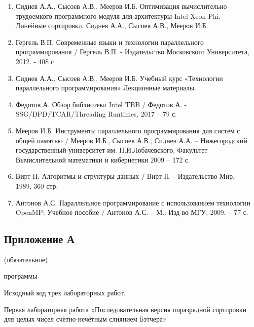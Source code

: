 \documentclass[a4paper,final]{report}
\begin{document}
\begin{spacing}{1.5}
\begin{enumerate}
		    \item Сиднев А.А., Сысоев А.В., Мееров И.Б.  Оптимизация вычислительно трудоемкого программного модуля для архитектуры Intel Xeon Phi. Линейные сортировки. Сиднев А.А., Сысоев А.В., Мееров И.Б. 
		    
			\item Гергель В.П. Современные языки и технологии параллельного программирования / Гергель В.П. - Издательство Московского Университета, 2012. - 408 с.
			
			\item Сиднев А.А., Сысоев А.В., Мееров И.Б. Учебный курс «Технологии параллельного программирования» Лекционные материалы. 
			
			\item Федотов А. Обзор библиотеки Intel TBB / Федотов А. - SSG/DPD/TCAR/Threading Runtimes, 2017 – 79 с.
			
			\item Мееров И.Б. Инструменты параллельного программирования для систем с общей памятью $/$ Мееров И.Б., Сысоев А.В., Сиднев А.А. – Нижегородский государственный университет им. Н.И.Лобачевского, Факультет Вычислительной математики и кибернетики 2009 – 172 с.
			
			\item Вирт Н. Алгоритмы и структуры данных $/$ Вирт Н. - Издательство Мир, 1989, 360 стр.
			
			\item Антонов А.С. Параллельное программирование с использованием технологии OpenMP: Учебное пособие $/$ Антонов А.С. – М.: Изд-во МГУ, 2009. – 77 с. 
			
		\end{enumerate}
		
		\newpage
		\begin{spacing}{0.5}
			\section*{\centering Приложение А}
		\end{spacing}
		\centerline{(обязательное)}
		\centerline{ программы} 
		\par Исходный код трех лабораторных работ.

\par Первая лабораторная работа «Последовательная версия поразрядной сортировки для целых чисел счётно-нечётным слиянием Бэтчера»
\begin{spacing}{0}
\end{spacing}


\end{spacing}
\end{document}
